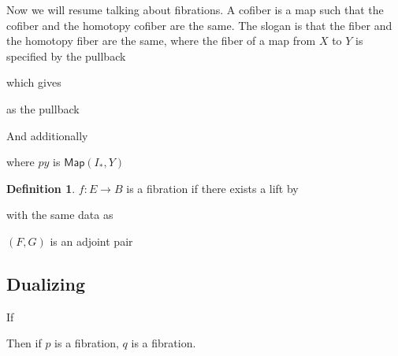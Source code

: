\documentclass[12pt]{article}
\theoremstyle{definition}
\newtheorem{definition}[theorem]{Definition}
\begin{document}
Now we will resume talking about fibrations. A cofiber is a map such that the cofiber and the homotopy cofiber are the same. The slogan is that the fiber and the homotopy fiber are the same, where the fiber of a map from $X$ to $Y$ is specified by the pullback\begin{center}
	 which gives 
	as the pullback
\end{center}
And additionally \begin{center}
\end{center}
where $py$ is $\mathsf{Map}(I_*,Y)$
\begin{definition}
	$f:E\to B$ is a fibration if there exists a lift by \begin{center}
		 with the same data as 
	\end{center}
\end{definition}
$(F,G)$ is an adjoint pair \begin{center}
\end{center}
\subsection{Dualizing}
If \begin{center}
\end{center}
Then if $p$ is a fibration, $q$ is a fibration. 
\end{document}
